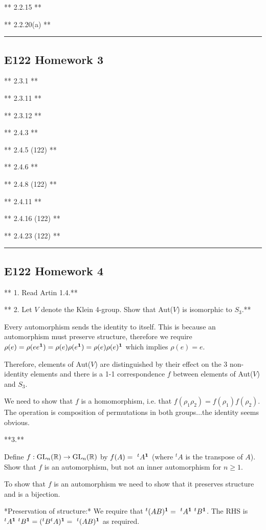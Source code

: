 ** 2.2.15 **

** 2.2.20(a) **


\hrule

\subsection{E122 Homework 3}

** 2.3.1 **

** 2.3.11 **

** 2.3.12 **

** 2.4.3 **

** 2.4.5 (122) **

** 2.4.6 **

** 2.4.8 (122) **

** 2.4.11 **

** 2.4.16 (122) **

** 2.4.23 (122) **


\hrule
\subsection{E122 Homework 4}
** 1. Read Artin 1.4.**

** 2. Let $V$ denote the Klein 4-group. Show that Aut($V$) is isomorphic to $S_3$.**

Every automorphism sends the identity to itself. This is because an
automorphism must preserve structure, therefore we require $\rho(e) =
\rho(ee^{\mathbf 1}) = \rho(e)\rho(e^{\mathbf 1}) = \rho(e)\rho(e)^{\mathbf 1}$ which implies $\rho(e) =
e$.

Therefore, elements of Aut($V$) are distinguished by their effect on the 3
non-identity elements and there is a 1-1 correspondence $f$ between elements of
Aut($V$) and $S_3$.

We need to show that $f$ is a homomorphism, i.e. that $f(\rho_1 \rho_2) =
f(\rho_1) f(\rho_2)$. The operation is composition of permutations in both
groups...the identity seems obvious.

**3.**

Define $f : \mathrm{GL}_n(\mathbb{R}) \rightarrow \mathrm{GL}_n(\mathbb{R})$ by $f(A) =~ ^tA^{\mathbf 1}$ (where $^tA$
is the transpose of $A$). Show that $f$ is an automorphism, but not an inner
automorphism for $n ≥ 1$.

To show that $f$ is an automorphism we need to show that it preserves structure
and is a bijection.

*Preservation of structure:* We require that $^t(AB)^{\mathbf 1} =~ ^tA^{\mathbf 1}~ ^tB^{\mathbf 1}$.
The RHS is $^tA^{\mathbf 1}~ ^tB^{\mathbf 1} = (^tB^tA)^{\mathbf 1} = ~^t(AB)^{\mathbf 1}$ as required.

